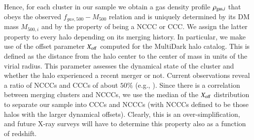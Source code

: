 \documentclass[useAMS,usenatbib]{mn2e}
\begin{document}
Hence, for each cluster in our sample we obtain a gas density profile
$\rho_{{\mathrm{gas}},i}$ that obeys the observed $f_{gas,500}-M_{500}$ relation and
is uniquely determined by its DM mass $M_{500,i}$ and by the property of being a
NCCC or CCC. We assign the latter property to every halo depending on its
merging history. In particular, we make use of the offset parameter
$X_{{\mathrm{off}}}$ computed for the MultiDark halo catalog. This is defined as the
distance from the halo center to the center of mass in units of the virial
radius. This parameter assesses the dynamical state of the cluster and whether
the halo experienced a recent merger or not. Current observations reveal a ratio
of NCCCs and CCCs of about $50\%$ (e.g., \citealp{2007A&A...466..805C,
  2009MNRAS.395..764S}). Since there is a correlation between merging clusters
and NCCCs, we use the median of the $X_{{\mathrm{off}}}$ distribution to separate our
sample into CCCs and NCCCs (with NCCCs defined to be those halos with the larger
dynamical offsets). Clearly, this is an over-simplification, and future X-ray
surveys will have to determine this property also as a function of redshift.
\end{document}
